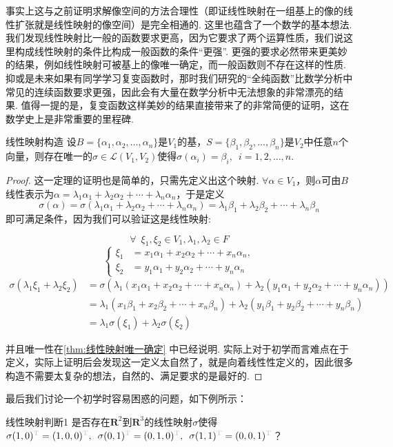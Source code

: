 事实上这与之前证明求解像空间的方法合理性（即证线性映射在一组基上的像的线性扩张就是线性映射的像空间）是完全相通的. 这里也蕴含了一个数学的基本想法. 我们发现线性映射比一般的函数要求更高，因为它要求了两个运算性质，我们说这里构成线性映射的条件比构成一般函数的条件``更强''. 更强的要求必然带来更美妙的结果，例如线性映射可被基上的像唯一确定，而一般函数则不存在这样的性质. 抑或是未来如果有同学学习复变函数时，那时我们研究的``全纯函数''比数学分析中常见的连续函数要求更强，因此会有大量在数学分析中无法想象的非常漂亮的结果. 值得一提的是，复变函数这样美妙的结果直接带来了的非常简便的证明，这在数学史上是非常重要的里程碑.

\begin{theorem}{}{线性映射构造}
    设$B=\{\alpha_1,\alpha_2,\ldots,\alpha_n\}$是$V_1$的基，$S=\{\beta_1,\beta_2,\ldots,\beta_n\}$是$V_2$中任意$n$个向量，则存在唯一的$\sigma\in \mathcal{L}(V_1,V_2)$使得$\sigma(\alpha_i)=\beta_i,\enspace i=1,2,\ldots,n$.
\end{theorem}

\begin{proof}
这一定理的证明也是简单的，只需先定义出这个映射. $\forall \alpha \in V_1$，则$\alpha$可由$B$线性表示为$\alpha=\lambda_1\alpha_1+\lambda_2\alpha_2+\cdots+\lambda_n\alpha_n$，于是定义
\[\sigma(\alpha)=\sigma(\lambda_1\alpha_1+\lambda_2\alpha_2+\cdots+\lambda_n\alpha_n)=\lambda_1\beta_1+\lambda_2\beta_2+\cdots+\lambda_n\beta_n\]
即可满足条件，因为我们可以验证这是线性映射:

\[
\forall \enspace \xi_1, \xi_2 \in V_1, \lambda_1, \lambda_2 \in F
\]
\[
\begin{cases}
    \xi_1 &= x_1\alpha_1+x_2\alpha_2+\cdots+x_n\alpha_n,\\
    \xi_2 &= y_1\alpha_1+y_2\alpha_2+\cdots+y_n\alpha_n
\end{cases}
\]
\begin{align*}
\sigma(\lambda_1 \xi_1 + \lambda_2 \xi_2) &= \sigma(\lambda_1(x_1\alpha_1+x_2\alpha_2+\cdots+x_n\alpha_n) + \lambda_2(y_1\alpha_1+y_2\alpha_2+\cdots+y_n\alpha_n))\\
&= \lambda_1(x_1\beta_1+x_2\beta_2+\cdots+x_n\beta_n) + \lambda_2(y_1\beta_1+y_2\beta_2+\cdots+y_n\beta_n)\\
&= \lambda_1\sigma(\xi_1) + \lambda_2\sigma(\xi_2)
\end{align*}

并且唯一性在\autoref{thm:线性映射唯一确定} 中已经说明. 实际上对于初学而言难点在于定义，实际上证明后会发现这一定义太自然了，就是向着线性性定义的，因此很多构造不需要太复杂的想法，自然的、满足要求的是最好的.
\end{proof}
最后我们讨论一个初学时容易困惑的问题，如下例所示：
\begin{example}{}{线性映射判断1}
    是否存在$\mathbf{R}^2$到$\mathbf{R}^3$的线性映射$\sigma$使得$\sigma(1,0)^{\color{lightgray}\mathrm{T}}=(1,0,0)^{\color{lightgray}\mathrm{T}},\enspace\sigma(0,1)^{\color{lightgray}\mathrm{T}}=(0,1,0)^{\color{lightgray}\mathrm{T}},\enspace\sigma(1,1)^{\color{lightgray}\mathrm{T}}=(0,0,1)^{\color{lightgray}\mathrm{T}}$？
\end{example}

